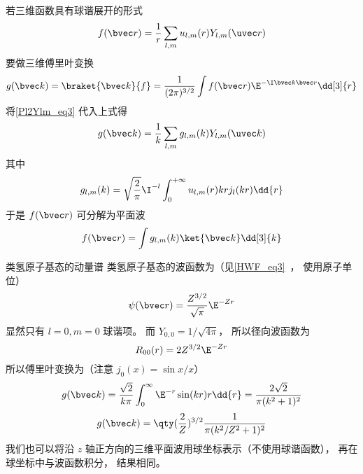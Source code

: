 若三维函数具有球谐展开的形式
\begin{equation}
f(\bvec r) = \frac{1}{r}\sum_{l,m} u_{l,m}(r) Y_{l,m}(\uvec r)
\end{equation}
要做三维傅里叶变换
\begin{equation}
g(\bvec k) = \braket{\bvec k}{f} =  \frac{1}{(2\pi)^{3/2}} \int f(\bvec r) \E^{-\I \bvec k \bvec r} \dd[3]{r}
\end{equation}
将\autoref{Pl2Ylm_eq3} 代入上式得
\begin{equation}
g(\bvec k) = \frac{1}{k} \sum_{l,m} g_{l,m}(k)  Y_{l,m}(\uvec k) 
\end{equation}
其中
\begin{equation}
g_{l,m}(k) = \sqrt{\frac{2}{\pi}} \I^{-l} \int_0^{+\infty} u_{l,m}(r) kr j_l(kr) \dd{r}
\end{equation}
于是 $f(\bvec r)$ 可分解为平面波
\begin{equation}
f(\bvec r) = \int g_{l,m}(k) \ket{\bvec k} \dd[3]{k}
\end{equation}

\begin{example}{类氢原子基态的动量谱}\label{Pl2Ylm_ex1}
类氢原子基态的波函数为（见\autoref{HWF_eq3}~， 使用原子单位）
\begin{equation}
\psi(\bvec r) = \frac{Z^{3/2}}{\sqrt\pi} \E^{-Zr}
\end{equation}
显然只有 $l = 0, m = 0$ 球谐项。 而 $Y_{0,0} = 1/\sqrt{4\pi}$， 所以径向波函数为
\begin{equation}
R_{00}(r) = 2 Z^{3/2} \E^{-Zr}
\end{equation}
所以傅里叶变换为（注意 $j_0(x) = \sin x/x$）
\begin{equation}
g(\bvec k) = \frac{\sqrt{2}}{k\pi} \int_0^\infty \E^{-r} \sin(kr) r \dd{r} = \frac{2\sqrt{2}}{\pi(k^2+1)^2}
\end{equation}
\begin{equation}
g(\bvec k) = \qty(\frac{2}{Z})^{3/2} \frac{1}{\pi(k^2/Z^2 + 1)^2}
\end{equation}
我们也可以将沿 $z$ 轴正方向的三维平面波用球坐标表示（不使用球谐函数）， 再在球坐标中与波函数积分， 结果相同。
\end{example}

